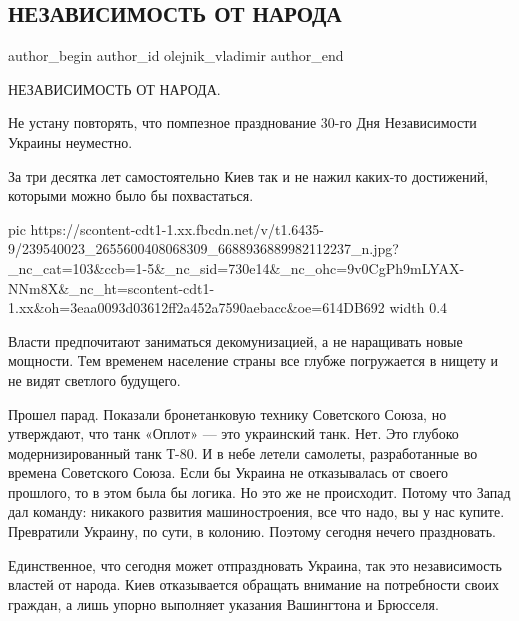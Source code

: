  
 
 
 
 
 
\subsection{НЕЗАВИСИМОСТЬ ОТ НАРОДА}
\label{sec:25_08_2021.fb.olejnik_vladimir.1.nezavisimost_ot_naroda}
 
\ifcmt
 author_begin
   author_id olejnik_vladimir
 author_end
\fi

НЕЗАВИСИМОСТЬ ОТ НАРОДА.

Не устану повторять, что помпезное празднование 30-го Дня Независимости Украины
неуместно.

За три десятка лет самостоятельно Киев так и не нажил каких-то достижений,
которыми можно было бы похвастаться.

\ifcmt
  pic https://scontent-cdt1-1.xx.fbcdn.net/v/t1.6435-9/239540023_2655600408068309_6688936889982112237_n.jpg?_nc_cat=103&ccb=1-5&_nc_sid=730e14&_nc_ohc=9v0CgPh9mLYAX-NNm8X&_nc_ht=scontent-cdt1-1.xx&oh=3eaa0093d03612ff2a452a7590aebacc&oe=614DB692
  width 0.4
\fi

Власти предпочитают заниматься декомунизацией, а не наращивать новые мощности.
Тем временем население страны все глубже погружается в нищету и не видят
светлого будущего.

Прошел парад. Показали бронетанковую технику Советского Союза, но утверждают,
что танк «Оплот» — это украинский танк. Нет. Это глубоко модернизированный танк
Т-80. И в небе летели самолеты, разработанные во времена Советского Союза. Если
бы Украина не отказывалась от своего прошлого, то в этом была бы логика. Но это
же не происходит. Потому что Запад дал команду: никакого развития
машиностроения, все что надо, вы у нас купите. Превратили Украину, по сути, в
колонию. Поэтому сегодня нечего праздновать.

Единственное, что сегодня может отпраздновать Украина, так это независимость
властей от народа. Киев отказывается обращать внимание на потребности своих
граждан, а лишь упорно выполняет указания Вашингтона и Брюсселя.

